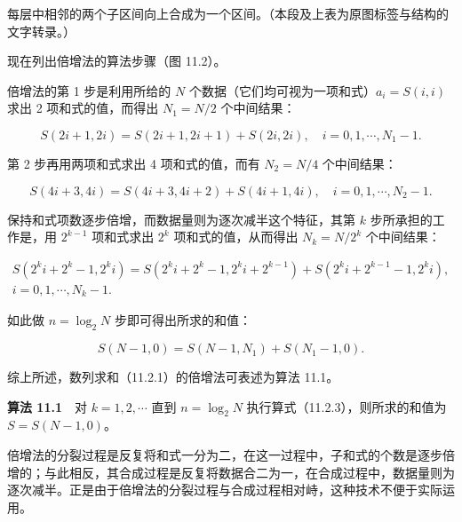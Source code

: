 \documentclass[
  10pt,
  fontset=fandol]{ctexart}
\begin{document}
每层中相邻的两个子区间向上合成为一个区间。（本段及上表为原图标签与结构的文字转录。）

现在列出倍增法的算法步骤（图 11.2）。

倍增法的第 1 步是利用所给的 \(N\) 个数据（它们均可视为一项和式）\(a_i=S(i,i)\) 求出 2 项和式的值，而得出 \(N_1=N/2\) 个中间结果：

\[
S(2i+1,2i)=S(2i+1,2i+1)+S(2i,2i),\quad i=0,1,\cdots,N_1-1.
\]

第 2 步再用两项和式求出 4 项和式的值，而有 \(N_2=N/4\) 个中间结果：

\[
S(4i+3,4i)=S(4i+3,4i+2)+S(4i+1,4i),\quad i=0,1,\cdots,N_2-1.
\]

保持和式项数逐步倍增，而数据量则为逐次减半这个特征，其第 \(k\) 步所承担的工作是，用 \(2^{k-1}\) 项和式求出 \(2^k\) 项和式的值，从而得出 \(N_k=N/2^k\) 个中间结果：

\[
\begin{gathered}
S(2^ki+2^k-1,2^ki)=S(2^ki+2^k-1,2^ki+2^{k-1})+S(2^ki+2^{k-1}-1,2^ki),\\
i=0,1,\cdots,N_k-1.
\end{gathered}
\tag{11.2.3}
\]

如此做 \(n=\log_2 N\) 步即可得出所求的和值：

\[
S(N-1,0)=S(N-1,N_1)+S(N_1-1,0).
\]

综上所述，数列求和（11.2.1）的倍增法可表述为算法 11.1。

\textbf{算法 11.1}　对 \(k=1,2,\cdots\) 直到 \(n=\log_2 N\) 执行算式（11.2.3），则所求的和值为 \(S=S(N-1,0)\)。

倍增法的分裂过程是反复将和式一分为二，在这一过程中，子和式的个数是逐步倍增的；与此相反，其合成过程是反复将数据合二为一，在合成过程中，数据量则为逐次减半。正是由于倍增法的分裂过程与合成过程相对峙，这种技术不便于实际运用。
\end{document}
